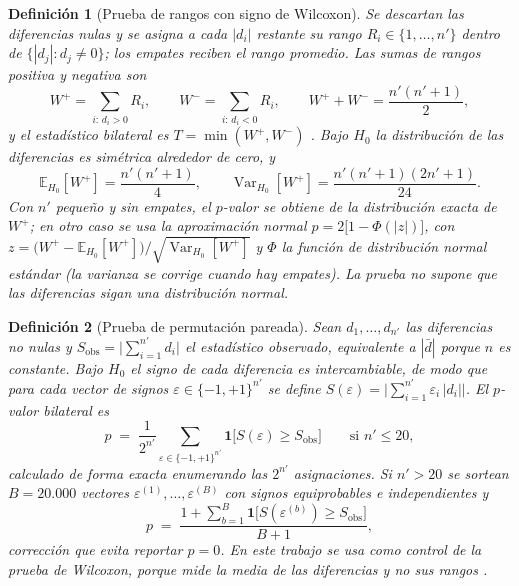 \documentclass[11pt,letterpaper]{article}
\newtheorem{definition}{Definición}[section]
\numberwithin{equation}{section}
\begin{document}
\begin{definition}[Prueba de rangos con signo de Wilcoxon]
\label{def:wilcoxon}
Se descartan las diferencias nulas y se asigna a cada $|d_i|$ restante su rango $R_i\in\{1,\dots,n'\}$ dentro de $\{|d_j|: d_j\neq 0\}$; los empates reciben el rango promedio. Las sumas de rangos positiva y negativa son
\begin{equation}
W^{+}=\sum_{i:\,d_i>0} R_i, \qquad W^{-}=\sum_{i:\,d_i<0} R_i, \qquad W^{+}+W^{-}=\frac{n'(n'+1)}{2},
\label{eq:wilcoxon}
\end{equation}
y el estadístico bilateral es $T=\min(W^{+},W^{-})$ \cite{wilcoxon1945}. Bajo $H_0$ la distribución de las diferencias es simétrica alrededor de cero, y
\begin{equation}
\mathbb{E}_{H_0}[W^{+}]=\frac{n'(n'+1)}{4}, \qquad \operatorname{Var}_{H_0}[W^{+}]=\frac{n'(n'+1)(2n'+1)}{24}.
\label{eq:wilcoxon-momentos}
\end{equation}
Con $n'$ pequeño y sin empates, el $p$-valor se obtiene de la distribución exacta de $W^{+}$; en otro caso se usa la aproximación normal $p=2\big[1-\Phi(|z|)\big]$, con $z=\big(W^{+}-\mathbb{E}_{H_0}[W^{+}]\big)/\sqrt{\operatorname{Var}_{H_0}[W^{+}]}$ y $\Phi$ la función de distribución normal estándar (la varianza se corrige cuando hay empates). La prueba no supone que las diferencias sigan una distribución normal.
\end{definition}

\begin{definition}[Prueba de permutación pareada]
\label{def:permutacion}
Sean $d_1,\dots,d_{n'}$ las diferencias no nulas y $S_{\text{obs}}=\big|\sum_{i=1}^{n'} d_i\big|$ el estadístico observado, equivalente a $|\bar d|$ porque $n$ es constante. Bajo $H_0$ el signo de cada diferencia es intercambiable, de modo que para cada vector de signos $\varepsilon\in\{-1,+1\}^{n'}$ se define $S(\varepsilon)=\big|\sum_{i=1}^{n'}\varepsilon_i\,|d_i|\big|$. El $p$-valor bilateral es
\begin{equation}
p \;=\; \frac{1}{2^{n'}}\sum_{\varepsilon\in\{-1,+1\}^{n'}} \mathbf{1}\big[S(\varepsilon)\geq S_{\text{obs}}\big]
\qquad \text{si } n'\leq 20,
\label{eq:perm-exacta}
\end{equation}
calculado de forma exacta enumerando las $2^{n'}$ asignaciones. Si $n'>20$ se sortean $B=20.000$ vectores $\varepsilon^{(1)},\dots,\varepsilon^{(B)}$ con signos equiprobables e independientes y
\begin{equation}
p \;=\; \frac{1+\sum_{b=1}^{B}\mathbf{1}\big[S(\varepsilon^{(b)})\geq S_{\text{obs}}\big]}{B+1},
\label{eq:perm-mc}
\end{equation}
corrección que evita reportar $p=0$. En este trabajo se usa como control de la prueba de Wilcoxon, porque mide la media de las diferencias y no sus rangos \cite{smucker2007significance}.
\end{definition}
\end{document}
